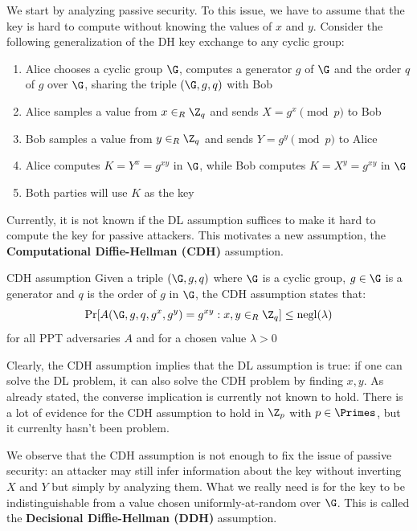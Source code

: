 \documentclass[a4paper, 12pt]{report}
\begin{document}
    We start by analyzing passive security. To  this issue, we have to assume that the key is hard to compute without knowing the values of $x$ and $y$. Consider the following generalization of the DH key exchange to any cyclic group:
    \begin{enumerate}
        \item Alice chooses a cyclic group $\G$, computes a generator $g$ of $\G$ and the order $q$ of $g$ over $\G$, sharing the triple $(\G,g,q)$ with Bob
        \item Alice samples a value from $x \in_R \Z_q$ and sends $X = g^{x} \pmod p$ to Bob
        \item Bob samples a value from $y \in_R \Z_q$ and sends $Y = g^{y} \pmod p$ to Alice
        \item Alice computes $K = Y^x = g^{xy}$ in $\G$, while Bob computes $K = X^y = g^{xy}$ in $\G$
        \item Both parties will use $K$ as the key
    \end{enumerate}

    Currently, it is not known if the DL assumption suffices to make it hard to compute the key for passive attackers. This motivates a new assumption, the \textbf{Computational Diffie-Hellman (CDH)} assumption.

    \begin{framedass}{CDH assumption}
        Given a triple $(\G,g,q)$ where $\G$ is a cyclic group, $g \in \G$ is a generator and $q$ is the order of $g$ in $\G$, the CDH assumption states that:
        \[\Pr[A(\G,g,q,g^x,g^y) = g^{xy} : x,y \in_R \Z_q] \leq \mathrm{negl}(\lambda)\]
        for all PPT adversaries $A$ and for a chosen value $\lambda > 0$
    \end{framedass}

    Clearly, the CDH assumption implies that the DL assumption is true: if one can solve the DL problem, it can also solve the CDH problem by finding $x,y$. As already stated, the converse implication is currently not known to hold. There is a lot of evidence for the CDH assumption to hold in $\Z_p$ with $p \in \Primes$, but it currenlty hasn't been problem.

    We observe that the CDH assumption is not enough to fix the issue of passive security: an attacker may still infer information about the key without inverting $X$ and $Y$ but simply by analyzing them. What we really need is for the key to be indistinguishable from a value chosen uniformly-at-random over $\G$. This is called the \textbf{Decisional Diffie-Hellman (DDH)} assumption.
\end{document}
